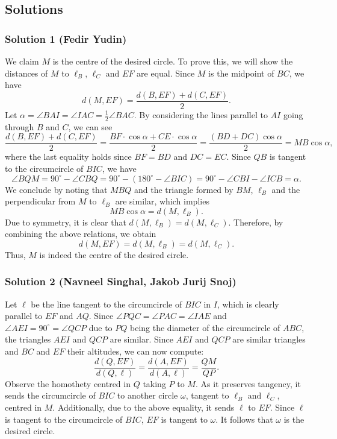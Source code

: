 \subsection{Solutions}
\subsubsection{Solution 1 (Fedir Yudin)}
We claim $M$ is the centre of the desired circle. To prove this, we will show the distances of $M$ to $\ell_B$, $\ell_C$ and $EF$ are equal.
\nl
Since $M$ is the midpoint of $BC$, we have
$$d(M, EF)=\frac{d(B, EF)+d(C, EF)}{2}.$$
Let $\alpha=\angle BAI=\angle IAC=\frac{1}{2}\angle BAC$. By considering the lines parallel to $AI$ going through $B$ and $C$, we can see
$$\frac{d(B, EF)+d(C, EF)}{2}=\frac{BF\cdot\cos\alpha+CE\cdot\cos\alpha}{2}=\frac{(BD+DC)\cos\alpha}{2}=MB\cos\alpha,$$
where the last equality holds since $BF=BD$ and $DC=EC$.
\nl
Since $QB$ is tangent to the circumcircle of $BIC$, we have
$$\angle BQM=90^\circ-\angle CBQ=90^\circ-(180^\circ-\angle BIC)=90^\circ-\angle CBI-\angle ICB=\alpha.$$
We conclude by noting that $MBQ$ and the triangle formed by $BM$, $\ell_B$ and the perpendicular from $M$ to $\ell_B$ are similar, which implies
$$MB\cos\alpha=d(M, \ell_B).$$
Due to symmetry, it is clear that $d(M, \ell_B)=d(M, \ell_C)$. Therefore, by combining the above relations, we obtain
$$d(M, EF)=d(M, \ell_B)=d(M, \ell_C).$$
Thus, $M$ is indeed the centre of the desired circle.
\nl
\subsubsection{Solution 2 (Navneel Singhal, Jakob Jurij Snoj)}
Let $\ell$ be the line tangent to the circumcircle of $BIC$ in $I$, which is clearly parallel to $EF$ and $AQ$. Since $\angle PQC=\angle PAC=\angle IAE$ and $\angle AEI=90^\circ=\angle QCP$ due to $PQ$ being the diameter of the circumcircle of $ABC$, the triangles $AEI$ and $QCP$ are similar.
\nl
Since $AEI$ and $QCP$ are similar triangles and $BC$ and $EF$ their altitudes, we can now compute:
$$\frac{d(Q, EF)}{d(Q, \ell)}=\frac{d(A, EF)}{d(A, \ell)}=\frac{QM}{QP}.$$
\nl
Observe the homothety centred in $Q$ taking $P$ to $M$. As it preserves tangency, it sends the circumcircle of $BIC$ to another circle $\omega$, tangent to $\ell_B$ and $\ell_C$, centred in $M$. Additionally, due to the above equality, it sends $\ell$ to $EF$. Since $\ell$ is tangent to the circumcircle of $BIC$, $EF$ is tangent to $\omega$. It follows that $\omega$ is the desired circle.
